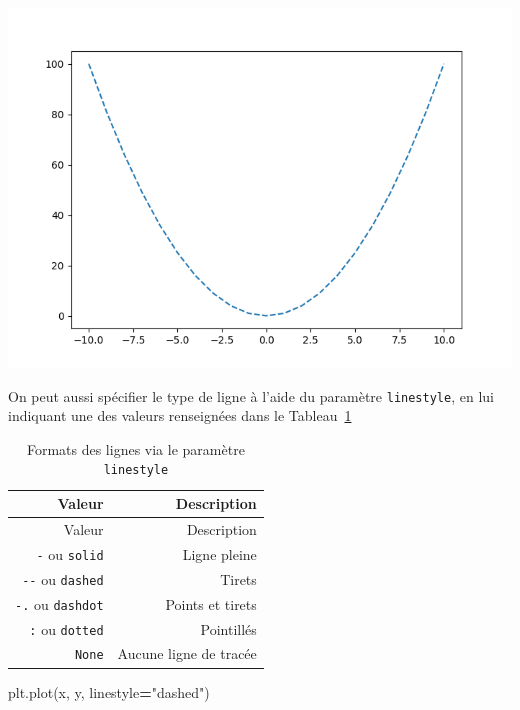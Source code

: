 \documentclass[
  12pt,
]{book}
\newenvironment{Shaded}{\begin{snugshade}}{\end{snugshade}}
\newcommand{\NormalTok}[1]{#1}
\newcommand{\OperatorTok}[1]{\textcolor[rgb]{0.81,0.36,0.00}{\textbf{#1}}}
\newcommand{\StringTok}[1]{\textcolor[rgb]{0.31,0.60,0.02}{#1}}
\numberwithin{equation}{section}
\numberwithin{countremarque}{section}
\begin{document}
\begin{center}\includegraphics[width=9.03in]{figs/pyplot/lignes_tirets} \end{center}

On peut aussi spécifier le type de ligne à l'aide du paramètre \texttt{linestyle}, en lui indiquant une des valeurs renseignées dans le Tableau~\ref{tab:fmt-lignes-2}

\begin{longtable}[]{@{}rr@{}}
\caption{\label{tab:fmt-lignes-2} Formats des lignes via le paramètre \texttt{linestyle}}\tabularnewline
\toprule\noalign{}
Valeur & Description \\
\midrule\noalign{}
\endfirsthead
\toprule\noalign{}
Valeur & Description \\
\midrule\noalign{}
\endhead
\bottomrule\noalign{}
\endlastfoot
\texttt{-} ou \texttt{solid} & Ligne pleine \\
\texttt{-\/-} ou \texttt{dashed} & Tirets \\
\texttt{-.} ou \texttt{dashdot} & Points et tirets \\
\texttt{:} ou \texttt{dotted} & Pointillés \\
\texttt{None} & Aucune ligne de tracée \\
\end{longtable}

\begin{Shaded}
\begin{Highlighting}[]
\NormalTok{plt.plot(x, y, linestyle}\OperatorTok{=}\StringTok{"dashed"}\NormalTok{)}
\end{Highlighting}
\end{Shaded}
\end{document}

